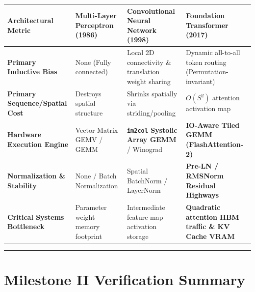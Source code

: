 \documentclass[
  letterpaper,
]{scrbook}
\newcounter{none} %
\begin{document}
{\def\LTcaptype{none} %
\begin{longtable}[]{@{}
  >{\raggedright\arraybackslash}p{}
  >{\raggedright\arraybackslash}p{}
  >{\raggedright\arraybackslash}p{}
  >{\raggedright\arraybackslash}p{}@{}}
\toprule\noalign{}
\begin{minipage}[b]{\linewidth}\raggedright
Architectural Metric
\end{minipage} & \begin{minipage}[b]{\linewidth}\raggedright
Multi-Layer Perceptron (1986)
\end{minipage} & \begin{minipage}[b]{\linewidth}\raggedright
Convolutional Neural Network (1998)
\end{minipage} & \begin{minipage}[b]{\linewidth}\raggedright
Foundation Transformer (2017)
\end{minipage} \\
\midrule\noalign{}
\endhead
\bottomrule\noalign{}
\endlastfoot
\textbf{Primary Inductive Bias} & None (Fully connected) & Local 2D
connectivity \& translation weight sharing & Dynamic all-to-all token
routing (Permutation-invariant) \\
\textbf{Primary Sequence/Spatial Cost} & Destroys spatial structure &
Shrinks spatially via striding/pooling & \(O(S^2)\) attention activation
map \\
\textbf{Hardware Execution Engine} & Vector-Matrix GEMV / GEMM &
\textbf{\texttt{im2col} Systolic Array GEMM} / Winograd &
\textbf{IO-Aware Tiled GEMM (FlashAttention-2)} \\
\textbf{Normalization \& Stability} & None / Batch Normalization &
Spatial BatchNorm / LayerNorm & \textbf{Pre-LN / RMSNorm Residual
Highways} \\
\textbf{Critical Systems Bottleneck} & Parameter weight memory footprint
& Intermediate feature map activation storage & \textbf{Quadratic
attention HBM traffic \& KV Cache VRAM} \\
\end{longtable}
}

\begin{center}\rule{0.5\linewidth}{0.5pt}\end{center}

\section*{Milestone II Verification
Summary}\label{milestone-ii-verification-summary}
\end{document}

